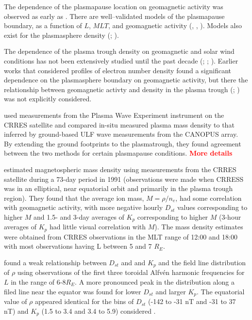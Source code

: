 \documentclass[10pt,twocolumn]{article}
\newcommand{\vinote}[1]{\textcolor{red}{\textbf{#1}}} %
\newcommand{\inote}[1]{\textcolor{blue}{\textbf{#1}}} %
\def\note#1\par{\textcolor{blue}{\textbf{#1}}\\}
\begin{document}
The dependence of the plasmapause location on geomagnetic activity was observed as early as \cite{Carpenter1966}.  There are well--validated models of the plasmapause boundary, as a function of $L$, $MLT$, and geomagnetic activity (\cite{LemaireEarthsPlasmasphere}, \cite{Moldwin2002ModelPlasmapause}, \cite{OBrien2003EmpiricalPlasmapause}).  Models also exist for the plasmasphere density (\cite{Gallagher1988EmpiricalModelPlasmasphere}; \cite{LemaireEarthsPlasmasphere}).

The dependence of the plasma trough density on geomagnetic and solar wind conditions has not been extensively studied until the past decade (\cite{Takahashi2006}; \cite{Takahashi2010}; \cite{Denton2016}). Earlier works that considered profiles of electron number density found a significant dependence on the plasmasphere boundary on geomagnetic activity, but there the relationship between geomagnetic activty and density in the plasma trough (\cite{Chappell1970}; \cite{Anderson1993}) was not explicitly considered.

\cite{Lotoaniu1999PlasmaMassDensity} used measurements from the Plasma Wave Experiment instrument on the CRRES satellite and compared in-situ measured plasma mass density to that inferred by ground-based ULF wave measurements from the CANOPUS array. By extending the ground footprints to the plasmatrough, they found agreement between the two methods for certain plasmapause conditions.  \vinote{More details}

\cite{Takahashi2006} estimated magnetospheric mass density using measurements from the CRRES satellite during a 73-day period in 1991 (observations were made when CRRESS was in an elliptical, near equatorial orbit and primarily in the plasma trough region). They found that the average ion mass, $M=\rho/n_e$, had some correlation with geomagnetic activity, with more negative hourly $D_{st}$ values corresponding to higher $M$ and 1.5- and 3-day averages of $K_p$ corresponding to higher $M$ (3-hour averages of $K_p$ had little visual correlation with $M$). The mass density estimates were obtained from CRRES observations in the MLT range of 12:00 and 18:00 with most observations having L between 5 and 7 $R_E$.

\cite{Denton2006} found a weak relationship between $D_{st}$ and and $K_p$ and the field line distribution of $\rho$ using observations of the first three toroidal Alfv\'en harmonic frequencies for $L$ in the range of 6-8$R_E$.  A more pronounced peak in the distribution along a filed line near the equator was found for lower $D_{st}$ and larger $K_p$.  The equatorial value of $\rho$ appeared identical for the bins of $D_{st}$ (-142 to -31 nT and -31 to 37 nT) and $K_p$ (1.5 to 3.4 and 3.4 to 5.9) considered .
\end{document}
